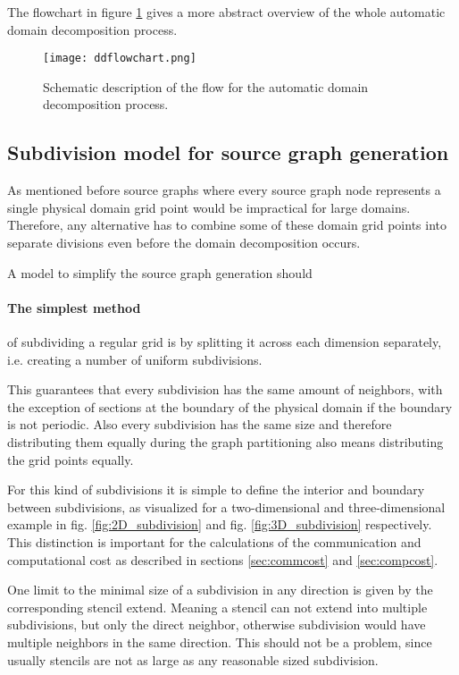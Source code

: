 The flowchart in figure \ref{fig:library_flowchart} gives a more abstract overview of the whole automatic domain decomposition process.

\begin{figure}
\centering
\texttt{[image: ddflowchart.png]}
\caption{Schematic description of the flow for the automatic domain decomposition process.}
\label{fig:library_flowchart}
\end{figure}

\subsection{Subdivision model for source graph generation}
\label{sec:subdivmodel}
As mentioned before source graphs where every source graph node represents a single physical domain grid point would be impractical for large domains.
Therefore, any alternative has to combine some of these domain grid points into separate divisions even before the domain decomposition occurs.

A model to simplify the source graph generation should 

\paragraph{The simplest method}of subdividing a regular grid is by splitting it across each dimension separately, i.e. creating a number of uniform subdivisions.

This guarantees that every subdivision has the same amount of neighbors, with the exception of sections at the boundary of the physical domain if the boundary is not periodic.
Also every subdivision has the same size and therefore distributing them equally during the graph partitioning also means distributing the grid points equally.

For this kind of subdivisions it is simple to define the interior and boundary between subdivisions, as visualized for a two-dimensional and three-dimensional example in fig. \ref{fig:2D_subdivision} and fig. \ref{fig:3D_subdivision} respectively.
This distinction is important for the calculations of the communication and computational cost as described in sections \ref{sec:commcost} and \ref{sec:compcost}.

One limit to the minimal size of a subdivision in any direction is given by the corresponding stencil extend.
Meaning a stencil can not extend into multiple subdivisions, but only the direct neighbor, otherwise subdivision would have multiple neighbors in the same direction.
This should not be a problem, since usually stencils are not as large as any reasonable sized subdivision.


